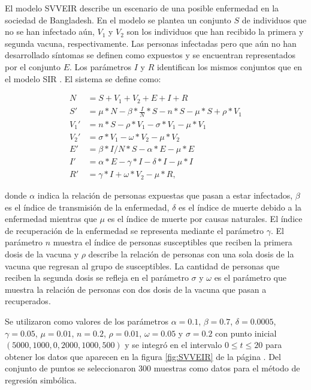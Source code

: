 El modelo SVVEIR describe un escenario de una posible enfermedad en la sociedad de Bangladesh. En el modelo se plantea un conjunto $S$ de individuos que no se han infectado aún, $V_1$ y $V_2$ son los individuos que han recibido la primera y segunda vacuna, respectivamente. Las personas infectadas pero que aún no han desarrollado síntomas se definen como expuestos y se encuentran representados por el conjunto $E$. Los parámetros $I$ y $R$ identifican los mismos conjuntos que en el modelo SIR \cite{kuddus2021mathematical}. El sistema se define como:


\begin{align*}
    N    & = S + V_1 + V_2 + E + I + R                                        \\
    S'   & = \mu * N - \beta * \frac{I}{N} * S - n * S - \mu * S + \rho * V_1 \\
    V_1' & = n * S - \rho * V_1 - \sigma * V_1 - \mu * V_1                    \\
    V_2' & = \sigma * V_1 - \omega * V_2 - \mu * V_2                          \\
    E'   & = \beta * I / N * S - \alpha * E - \mu * E                         \\
    I'   & = \alpha * E - \gamma * I - \delta * I - \mu * I                   \\
    R'   & = \gamma * I + \omega * V_2 - \mu * R,
\end{align*}

donde $\alpha$ indica la relación de personas expuestas que pasan a estar infectados, $\beta$ es el índice de transmisión de la enfermedad, $\delta$ es el índice de muerte debido a la enfermedad mientras que $\mu$ es el índice de muerte por causas naturales. El índice de recuperación de la enfermedad se representa mediante el parámetro $\gamma$. El parámetro $n$ muestra el índice de personas susceptibles que reciben la primera dosis de la vacuna y $\rho$ describe la relación de personas con una sola dosis de la vacuna que regresan al grupo de susceptibles. La cantidad de personas que reciben la segunda dosis se refleja en el parámetro $\sigma$ y $\omega$ es el parámetro que muestra la relación de personas con dos dosis de la vacuna que pasan a recuperados.

Se utilizaron como valores de los parámetros $\alpha = 0.1$, $\beta = 0.7$, $\delta = 0.0005$, $\gamma = 0.05$, $\mu = 0.01$, $n = 0.2$, $\rho = 0.01$, $\omega = 0.05$ y $\sigma = 0.2$ con punto inicial $(5000, 1000, 0, 2000, 1000, 500)$ y se integró en el intervalo $0 \leq t \leq 20$ para obtener los datos que aparecen en la figura \ref{fig:SVVEIR} de la página \pageref{fig:SVVEIR}. Del conjunto de puntos se seleccionaron 300 muestras como datos para el método de regresión simbólica.


